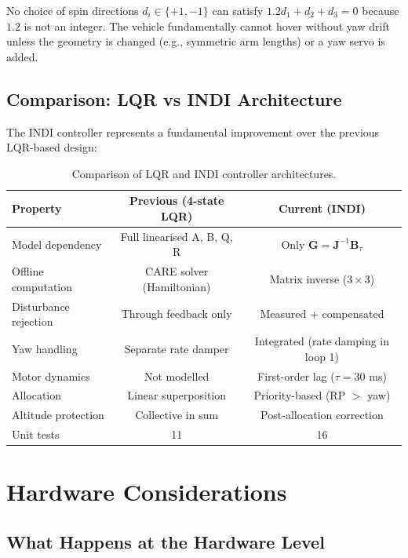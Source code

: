 \documentclass[12pt, a4paper]{article}
\newcommand{\bJ}{\bm{J}}
\newcommand{\bB}{\bm{B}}
\begin{document}
No choice of spin directions $d_i \in \{+1, -1\}$ can satisfy $1.2 d_1 + d_2 + d_3 = 0$ because $1.2$ is not an integer.  The vehicle fundamentally cannot hover without yaw drift unless the geometry is changed (e.g., symmetric arm lengths) or a yaw servo is added.

\subsection{Comparison: LQR vs INDI Architecture}

The INDI controller represents a fundamental improvement over the previous LQR-based design:

\begin{table}[H]
\centering
\small
\begin{tabular}{lcc}
\toprule
\textbf{Property} & \textbf{Previous (4-state LQR)} & \textbf{Current (INDI)} \\
\midrule
Model dependency & Full linearised A, B, Q, R & Only $\bm{G} = \bJ^{-1}\bB_\tau$ \\
Offline computation & CARE solver (Hamiltonian) & Matrix inverse ($3 \times 3$) \\
Disturbance rejection & Through feedback only & Measured + compensated \\
Yaw handling & Separate rate damper & Integrated (rate damping in loop 1) \\
Motor dynamics & Not modelled & First-order lag ($\tau = 30$ ms) \\
Allocation & Linear superposition & Priority-based (RP $>$ yaw) \\
Altitude protection & Collective in sum & Post-allocation correction \\
Unit tests & 11 & 16 \\
\bottomrule
\end{tabular}
\caption{Comparison of LQR and INDI controller architectures.}
\end{table}

\section{Hardware Considerations}
\label{sec:hardware}

\subsection{What Happens at the Hardware Level}
\end{document}
